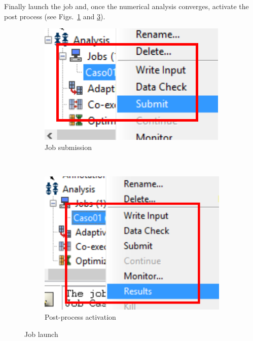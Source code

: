   Finally launch the job and, once the numerical analysis converges,
  activate the post process (see Figs.~\ref{job04} and \ref{job05}).
  \begin{figure}[!h]
    \centering
    \begin{subfigure}[!h]{0.42\textwidth}
      \includegraphics[width=\textwidth]{./body/images/job04.pdf}
      \caption{Job submission}
      \label{job04}
    \end{subfigure}%
    ~ %
    \begin{subfigure}[!h]{0.42\textwidth}
      \includegraphics[width=\textwidth]{./body/images/job05.pdf}
      \caption{Post-process activation}
      \label{job05}
    \end{subfigure}%
    \caption{Job launch}
  \end{figure}

